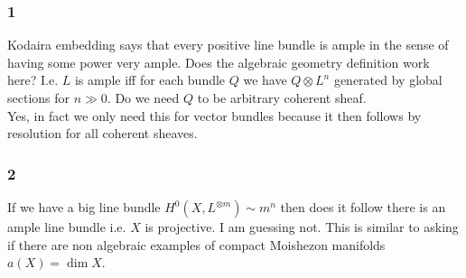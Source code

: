 \documentclass[12pt]{article}
\begin{document}
\subsubsection{1}

Kodaira embedding says that every positive line bundle is ample in the sense of having some power very ample. Does the algebraic geometry definition work here? I.e. $L$ is ample iff for each bundle $Q$ we have $Q \otimes L^n$ generated by global sections for $n \gg 0$. Do we need $Q$ to be arbitrary coherent sheaf.
\\
Yes, in fact we only need this for vector bundles because it then follows by resolution for all coherent sheaves.

\subsubsection{2}

If we have a big line bundle $H^0(X, L^{\otimes m}) \sim m^n$ then does it follow there is an ample line bundle i.e. $X$ is projective. I am guessing not. This is similar to asking if there are non algebraic examples of compact Moishezon manifolds $a(X) = \dim{X}$.
\end{document}
